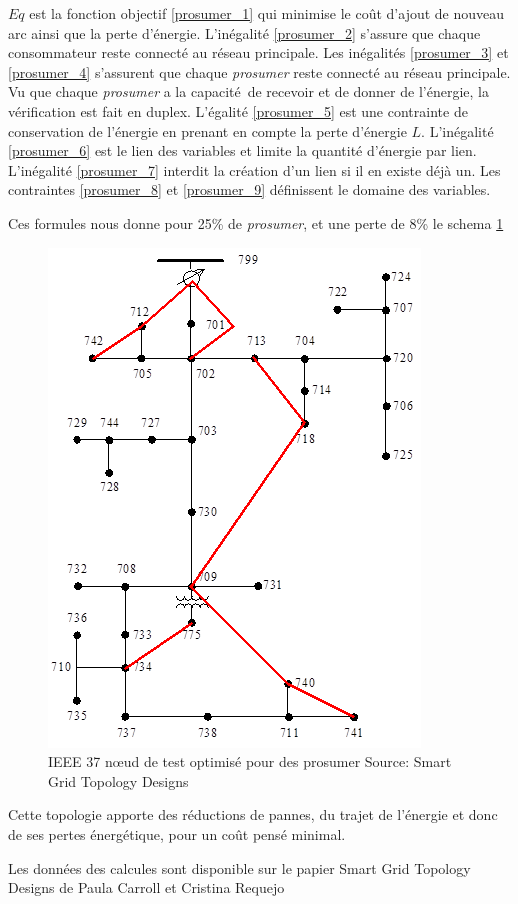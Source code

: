 $Eq$ est la fonction objectif \ref{prosumer_1} qui minimise le coût d'ajout de nouveau arc
ainsi que la perte d'énergie.
L'inégalité \ref{prosumer_2} s'assure que chaque consommateur reste connecté au réseau principale.
Les inégalités \ref{prosumer_3} et \ref{prosumer_4} s'assurent que chaque \textit{prosumer} reste connecté au réseau principale.
Vu que chaque \textit{prosumer} a la capacité de recevoir et de donner de l'énergie, la vérification
est fait en duplex.
L'égalité \ref{prosumer_5} est une contrainte de conservation de l'énergie en prenant en compte la perte d'énergie $L$.
L'inégalité \ref{prosumer_6} est le lien des variables et limite la quantité d'énergie par lien.
L'inégalité \ref{prosumer_7} interdit la création d'un lien si il en existe déjà un.
Les contraintes \ref{prosumer_8} et \ref{prosumer_9} définissent le domaine des variables.

Ces formules nous donne pour 25\% de \textit{prosumer}, et une perte de 8\% le schema \ref{fig:ieee_radial_tree_optimized}

\begin{figure}
  \includegraphics[scale=0.5]{media/ieee_radial_tree_optimized.png}
  \caption{
      IEEE 37 nœud de test optimisé pour des prosumer\newline
      \tiny{Source:\newline
        Smart Grid Topology Designs
      }
  }
  \label{fig:ieee_radial_tree_optimized}
\end{figure}

Cette topologie apporte des réductions de pannes, du trajet de l'énergie et donc de ses pertes énergétique, pour un coût
pensé minimal.

Les données des calcules sont disponible sur le papier Smart Grid Topology Designs de Paula Carroll et Cristina Requejo